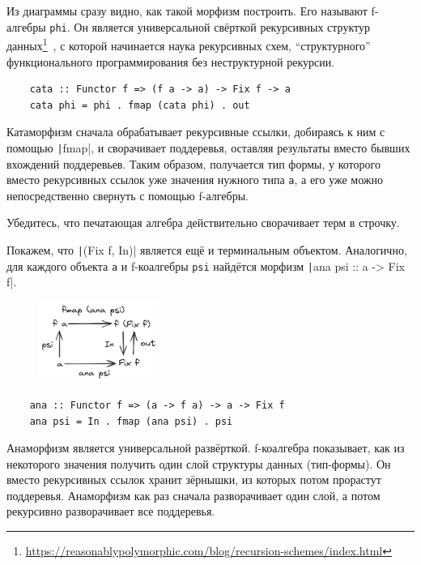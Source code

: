 Из диаграммы сразу видно, как такой морфизм построить.
Его называют  f-алгебры \texttt{phi}.
Он является универсальной свёрткой рекурсивных структур данных\footnote{\url{https://reasonablypolymorphic.com/blog/recursion-schemes/index.html}}~\cite{meijer1991functional, meijer1995bananas}, с которой начинается наука рекурсивных схем, ``структурного'' функционального программирования без неструктурной рекурсии.
\begin{verbatim}
    cata :: Functor f => (f a -> a) -> Fix f -> a
    cata phi = phi . fmap (cata phi) . out
\end{verbatim}

Катаморфизм сначала обрабатывает рекурсивные ссылки, добираясь к ним с помощью \texttt|fmap|, и сворачивает поддеревья, оставляя результаты вместо бывших вхождений поддеревьев.
Таким образом, получается тип формы, у которого вместо рекурсивных ссылок уже значения нужного типа \texttt{a}, а его уже можно непосредственно свернуть с помощью f-алгебры.


\begin{task}
    Убедитесь, что печатающая алгебра действительно сворачивает терм в строчку.
\end{task}

Покажем, что \texttt|(Fix f, In)| является ещё и терминальным объектом.
Аналогично, для каждого объекта \texttt{a} и f-коалгебры \texttt{psi} найдётся морфизм \texttt|ana psi :: a -> Fix f|.
\begin{figure}[h!]
    \centering
    \includegraphics[width=0.35\textwidth]{figs/ana}
\end{figure}

\begin{verbatim}
    ana :: Functor f => (a -> f a) -> a -> Fix f
    ana psi = In . fmap (ana psi) . psi
\end{verbatim}

Анаморфизм является универсальной развёрткой.
f-коалгебра показывает, как из некоторого значения получить один слой структуры данных (тип-формы).
Он вместо рекурсивных ссылок хранит зёрнышки, из которых потом прорастут поддеревья.
Анаморфизм как раз сначала разворачивает один слой, а потом рекурсивно разворачивает все поддеревья.

